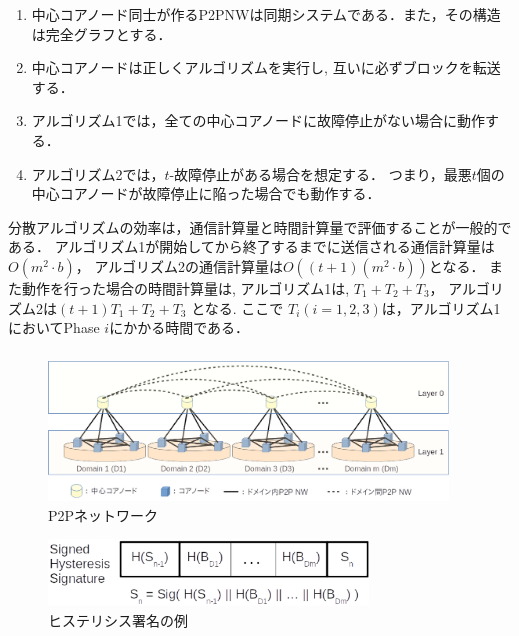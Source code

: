 \documentclass[a4paper,12pt]{jsarticle}
\begin{document}
\hspace{5mm}
%
\begin{enumerate}
\item 中心コアノード同士が作るP2PNWは同期システムである．また，その構造は完全グラフとする．

\item 中心コアノードは正しくアルゴリズムを実行し, 互いに必ずブロックを転送する．

\item アルゴリズム1では，全ての中心コアノードに故障停止がない場合に動作する．
	
\item アルゴリズム2では，$t$-故障停止がある場合を想定する．
      つまり，最悪$t$個の中心コアノードが故障停止に陥った場合でも動作する．
\end{enumerate}
%
\hspace{5mm}
分散アルゴリズムの効率は，通信計算量と時間計算量で評価することが一般的である．
アルゴリズム1が開始してから終了するまでに送信される通信計算量は$O(m^2 \cdot b)$，
アルゴリズム2の通信計算量は$O((t+1)(m^2 \cdot b))$となる．
また動作を行った場合の時間計算量は, アルゴリズム1は, $ T_1 + T_2 + T_3 $，
アルゴリズム2は$ ( t + 1 ) T_1 + T_2 + T_3 $ となる. 
ここで $T_i (i=1, 2, 3)$は，アルゴリズム1においてPhase $i$にかかる時間である．

\newpage

\subsubsection{}


%
\begin{figure}[h]
    \begin{center}
      \includegraphics[width=106mm]{pht/p2p_network_image_r1.eps}
    \end{center}
    \caption{P2Pネットワーク}
    \label{fig:p2p}
  \end{figure}
  \begin{figure}[tb]
    \begin{center}
      \includegraphics[width=85mm]{pht/hysteresis_signature.eps}
    \end{center}
    \caption{ヒステリシス署名の例}
    \label{fig:hysteresis}
  \end{figure}
\end{document}
